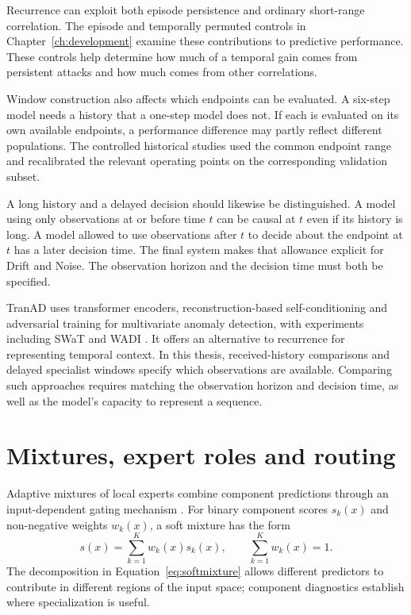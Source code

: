 Recurrence can exploit both episode persistence and ordinary short-range correlation. The episode and temporally permuted controls in Chapter~\ref{ch:development} examine these contributions to predictive performance. These controls help determine how much of a temporal gain comes from persistent attacks and how much comes from other correlations.

Window construction also affects which endpoints can be evaluated. A six-step model needs a history that a one-step model does not. If each is evaluated on its own available endpoints, a performance difference may partly reflect different populations. The controlled historical studies used the common endpoint range and recalibrated the relevant operating points on the corresponding validation subset.

A long history and a delayed decision should likewise be distinguished. A model using only observations at or before time $t$ can be causal at $t$ even if its history is long. A model allowed to use observations after $t$ to decide about the endpoint at $t$ has a later decision time. The final system makes that allowance explicit for Drift and Noise. The observation horizon and the decision time must both be specified.

TranAD uses transformer encoders, reconstruction-based self-conditioning and adversarial training for multivariate anomaly detection, with experiments including SWaT and WADI \cite{tranad2022}. It offers an alternative to recurrence for representing temporal context. In this thesis, received-history comparisons and delayed specialist windows specify which observations are available. Comparing such approaches requires matching the observation horizon and decision time, as well as the model's capacity to represent a sequence.

\section{Mixtures, expert roles and routing}
Adaptive mixtures of local experts combine component predictions through an input-dependent gating mechanism \cite{moe}. For binary component scores $s_k(x)$ and non-negative weights $w_k(x)$, a soft mixture has the form
\begin{equation}
 s(x)=\sum_{k=1}^{K}w_k(x)s_k(x),\qquad \sum_{k=1}^{K}w_k(x)=1.
 \label{eq:softmixture}
\end{equation}
The decomposition in Equation~\eqref{eq:softmixture} allows different predictors to contribute in different regions of the input space; component diagnostics establish where specialization is useful.

